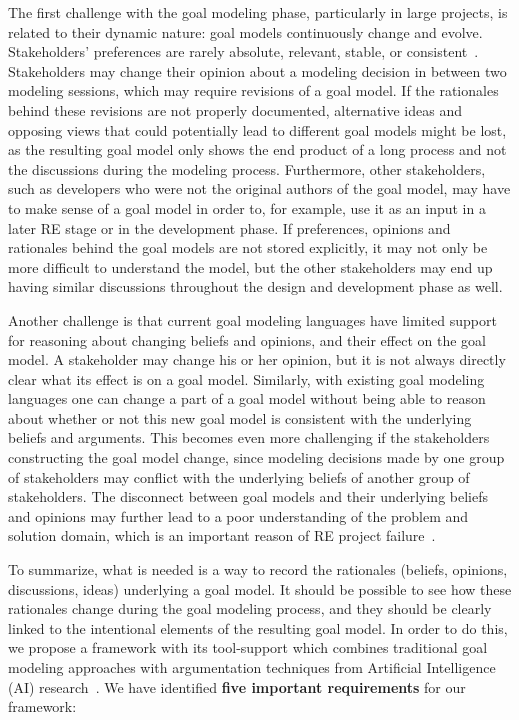 The first challenge with the goal modeling phase, particularly in large projects, is related to their dynamic nature: goal models continuously change and evolve. Stakeholders' preferences are rarely absolute, relevant, stable, or consistent~\cite{march1978bounded}. Stakeholders may change their opinion about a modeling decision in between two modeling sessions, which may require revisions of a goal model. If the rationales behind these revisions are not properly documented, alternative ideas and opposing views that could potentially lead to different goal models might be lost, as the resulting goal model only shows the end product of a long process and not the discussions during the modeling process. Furthermore, other stakeholders, such as developers who were not the original authors of the goal model, may have to make sense of a goal model in order to, for example, use it as an input in a later RE stage or in the development phase. If preferences, opinions and rationales behind the goal models are not stored explicitly, it may not only be more difficult to understand the model, but the other stakeholders may end up having similar discussions throughout the design and development phase as well.

Another challenge is that current goal modeling languages have limited support for reasoning about changing beliefs and opinions, and their effect on the goal model. A stakeholder may change his or her opinion, but it is not always directly clear what its effect is on a goal model. Similarly, with existing goal modeling languages one can change a part of a goal model without being able to reason about whether or not this new goal model is consistent with the underlying beliefs and arguments. This becomes even more challenging if the stakeholders constructing the goal model change, since modeling decisions made by one group of stakeholders may conflict with the underlying beliefs of another group of stakeholders. The disconnect between goal models and their underlying beliefs and opinions may further lead to a poor understanding of the problem and solution domain, which is an important reason of RE project failure~\cite{curtis1988field}. 

To summarize, what is needed is a way to record the rationales (beliefs, opinions, discussions, ideas) underlying a goal model. It should be possible to see how these rationales change during the goal modeling process, and they  should be clearly linked to the intentional elements of the resulting goal model. In order to do this, we propose a framework with its tool-support which combines traditional goal modeling approaches with argumentation techniques from Artificial Intelligence (AI) research~\cite{BenchCaponDunne2007}. We have identified \textbf{five important requirements} for our framework: 

